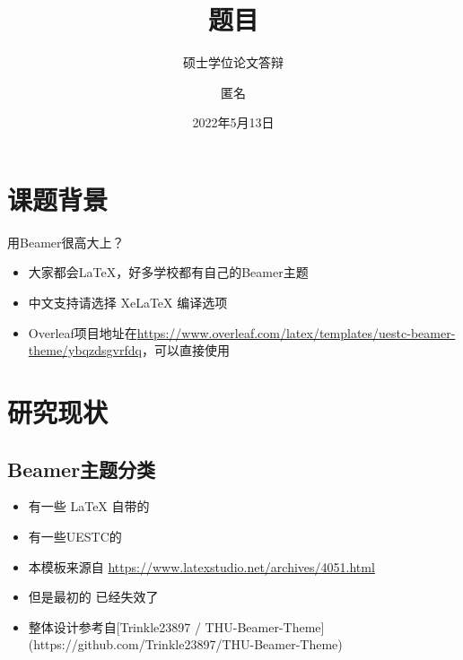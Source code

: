 \documentclass{beamer}
\author{匿名}
\title{题目}
\subtitle{硕士学位论文答辩}
\institute{电子科技大学}
\date{2022年5月13日}
\begin{document}
\kaishu
\begin{frame}
    \titlepage
\end{frame}

\begin{frame}
    \tableofcontents[sectionstyle=show,subsectionstyle=show/shaded/hide,subsubsectionstyle=show/shaded/hide]
\end{frame}


\section{课题背景}

\begin{frame}{用Beamer很高大上？}
    \begin{itemize}[<+-| alert@+>] %
        \item 大家都会\LaTeX{}，好多学校都有自己的Beamer主题
        \item 中文支持请选择 Xe\LaTeX{} 编译选项
        \item Overleaf项目地址在\url{https://www.overleaf.com/latex/templates/uestc-beamer-theme/ybqzdsgvrfdq}，可以直接使用
    \end{itemize}
\end{frame}


\section{研究现状}

\subsection{Beamer主题分类}

\begin{frame}
    \begin{itemize}
        \item 有一些 \LaTeX{} 自带的
        \item 有一些UESTC的
        \item 本模板来源自 \newline \url{https://www.latexstudio.net/archives/4051.html}
        \item 但是最初的 \href{http://far.tooold.cn/post/latex/beamerdlut}{\color{purple}{link}} \cite{origin}已经失效了
        \item 整体设计参考自[Trinkle23897 / THU-Beamer-Theme](https://github.com/Trinkle23897/THU-Beamer-Theme)
    \end{itemize}
\end{frame}
\end{document}
